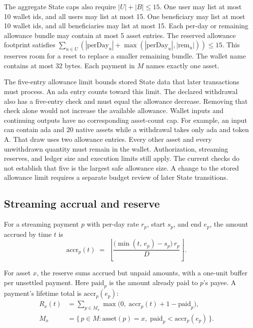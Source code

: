 \documentclass[11pt,DIV=11,parskip=half-]{scrartcl}
\begin{document}
The aggregate State caps also require $|U| + |B| \le 15$. One user may list at most 10 wallet ids, and all users may list at most 15. One beneficiary may list at most 10 wallet ids, and all beneficiaries may list at most 15. Each per-day or remaining allowance bundle may contain at most 5 asset entries. The reserved allowance footprint satisfies $\sum_{u \in U} \left(|\mathrm{perDay}_u| + \max(|\mathrm{perDay}_u|, |\mathrm{rem}_u|)\right) \le 15$. This reserves room for a reset to replace a smaller remaining bundle. The wallet name contains at most 32 bytes. Each payment in $M$ names exactly one asset.

The five-entry allowance limit bounds stored State data that later transactions must process. An ada entry counts toward this limit. The declared withdrawal also has a five-entry check and must equal the allowance decrease. Removing that check alone would not increase the available allowance. Wallet inputs and continuing outputs have no corresponding asset-count cap. For example, an input can contain ada and 20 native assets while a withdrawal takes only ada and token A. That draw uses two allowance entries. Every other asset and every unwithdrawn quantity must remain in the wallet. Authorization, streaming reserves, and ledger size and execution limits still apply. The current checks do not establish that five is the largest safe allowance size. A change to the stored allowance limit requires a separate budget review of later State transitions.

\subsection{Streaming accrual and reserve}
\begin{definition}[Accrual]
For a streaming payment $p$ with per-day rate $r_p$, start $s_p$, and end $e_p$, the amount accrued by time $t$ is
\[
  \mathrm{accr}_p(t) \;=\; \left\lfloor \frac{\big(\min(t,\, e_p) - s_p\big)\, r_p}{D} \right\rfloor .
\]
\end{definition}
\begin{definition}[Per-asset reserve]
For asset $x$, the reserve sums accrued but unpaid amounts, with a one-unit buffer per unsettled payment. Here $\mathrm{paid}_p$ is the amount already paid to $p$'s payee. A payment's lifetime total is $\mathrm{accr}_p(e_p)$:
\[
  \begin{aligned}
    R_x(t) &= \sum_{p \in M_x} \max\!\big(0,\; \mathrm{accr}_p(t) + 1 - \mathrm{paid}_p\big), \\
    M_x &= \{\, p \in M : \mathrm{asset}(p) = x,\; \mathrm{paid}_p < \mathrm{accr}_p(e_p) \,\}.
  \end{aligned}
\]
\end{definition}
\end{document}
